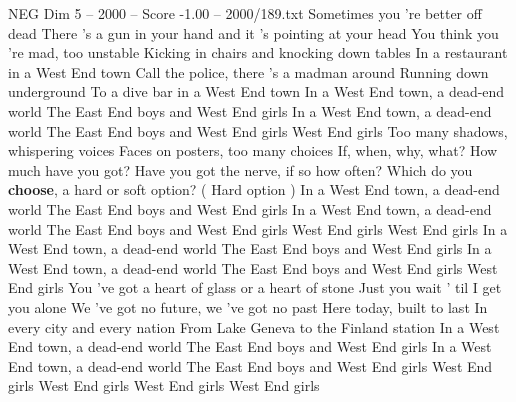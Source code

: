 \begin{textsample}{NEG Dim 5 – 2000 – Score -1.00 – 2000/189.txt}  \label{ex:f5_neg_034}
Sometimes you 're better off dead There 's a gun in your hand and it 's pointing at your head You think you 're mad, too unstable Kicking in chairs and knocking down tables In a restaurant in a West End town Call the police, there 's a madman around Running down underground To a dive bar in a West End town In a West End town, a dead-end world The East End boys and West End girls In a West End town, a dead-end world The East End boys and West End girls West End girls Too many shadows, whispering voices Faces on posters, too many choices If, when, why, what?
How much have you got?
Have you got the nerve, if so how often?
Which do you \textbf{choose}, a hard or soft option? ( Hard option ) In a West End town, a dead-end world The East End boys and West End girls In a West End town, a dead-end world The East End boys and West End girls West End girls West End girls In a West End town, a dead-end world The East End boys and West End girls In a West End town, a dead-end world The East End boys and West End girls West End girls You 've got a heart of glass or a heart of stone Just you wait ' til I get you alone We 've got no future, we 've got no past Here today, built to last In every city and every nation From Lake Geneva to the Finland station In a West End town, a dead-end world The East End boys and West End girls In a West End town, a dead-end world The East End boys and West End girls West End girls West End girls West End girls West End girls

\end{textsample}
